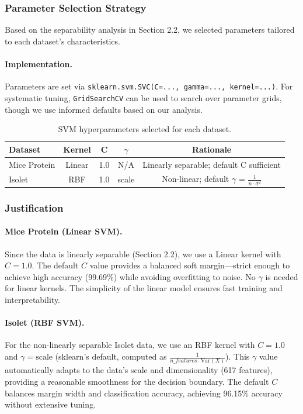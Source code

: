 \documentclass[12pt]{article}
\begin{document}
\subsubsection{Parameter Selection Strategy}
Based on the separability analysis in Section 2.2, we selected parameters tailored to each dataset's characteristics.

\paragraph{Implementation.} Parameters are set via \texttt{sklearn.svm.SVC(C=..., gamma=..., kernel=...)}. For systematic tuning, \texttt{GridSearchCV} can be used to search over parameter grids, though we use informed defaults based on our analysis.

\begin{table}[H]
\centering
\begin{tabular}{lcccc}
\toprule
\textbf{Dataset} & \textbf{Kernel} & \textbf{C} & \textbf{$\gamma$} & \textbf{Rationale} \\
\midrule
Mice Protein & Linear & 1.0 & N/A & Linearly separable; default C sufficient \\
Isolet & RBF & 1.0 & scale & Non-linear; default $\gamma$ = $\frac{1}{n \cdot \sigma^2}$ \\
\bottomrule
\end{tabular}
\caption{SVM hyperparameters selected for each dataset.}
\label{tab:svm_params}
\end{table}

\subsubsection{Justification}

\paragraph{Mice Protein (Linear SVM).} Since the data is linearly separable (Section 2.2), we use a Linear kernel with $C=1.0$. The default $C$ value provides a balanced soft margin—strict enough to achieve high accuracy (99.69\%) while avoiding overfitting to noise. No $\gamma$ is needed for linear kernels. The simplicity of the linear model ensures fast training and interpretability.

\paragraph{Isolet (RBF SVM).} For the non-linearly separable Isolet data, we use an RBF kernel with $C=1.0$ and $\gamma=\text{scale}$ (sklearn's default, computed as $\frac{1}{n\_features \cdot \text{Var}(X)}$). This $\gamma$ value automatically adapts to the data's scale and dimensionality (617 features), providing a reasonable smoothness for the decision boundary. The default $C$ balances margin width and classification accuracy, achieving 96.15\% accuracy without extensive tuning.
\end{document}
